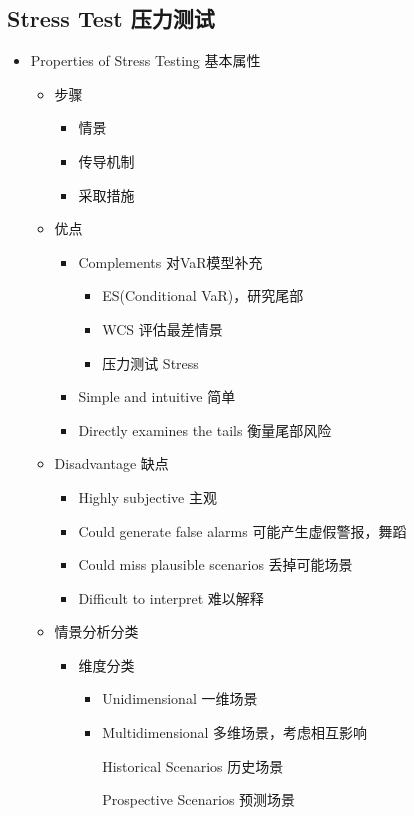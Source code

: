 \documentclass[a4paper,6pt,twoside,openany]{article}
\begin{document}
\subsection{Stress Test 压力测试}
\begin{itemize}
\item Properties of Stress Testing 基本属性
  \begin{itemize}
  \item 步骤
    \begin{itemize}
    \item 情景
    \item 传导机制
    \item 采取措施
    \end{itemize}
  \item 优点
    \begin{itemize}
    \item Complements 对VaR模型补充
     \begin{itemize}
      \item ES(Conditional VaR)，研究尾部
      \item WCS 评估最差情景
      \item 压力测试 Stress
      \end{itemize}
    \item Simple and intuitive 简单
    \item Directly examines the tails 衡量尾部风险
    \end{itemize}
  \item Disadvantage 缺点
    \begin{itemize}
    \item Highly subjective 主观
    \item Could generate false alarms 可能产生虚假警报，舞蹈
    \item Could miss plausible scenarios 丢掉可能场景
    \item Difficult to interpret 难以解释
    \end{itemize}
  \item 情景分析分类
    \begin{itemize}
    \item 维度分类
      \begin{itemize}
      \item Unidimensional 一维场景
      \item Multidimensional 多维场景，考虑相互影响
        \par Historical Scenarios 历史场景
        \par Prospective Scenarios 预测场景

\end{itemize}
\end{itemize}
\end{itemize}
\end{itemize}
\end{document}
